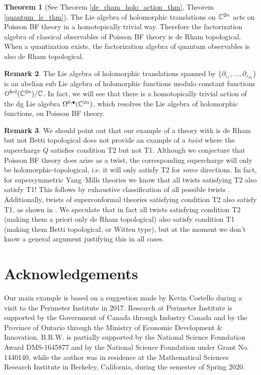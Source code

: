 \documentclass[11pt, oneside, reqno]{amsart}
\theoremstyle{definition} \newtheorem{definition}{Definition}[section]
\newtheorem{theorem}[definition]{Theorem}
\theoremstyle{definition}
\theoremstyle{remark}
\theoremstyle{definition} \newtheorem{remark}[definition]{Remark}
\theoremstyle{definition} \newtheorem{remarks}[definition]{Remarks}
\theoremstyle{definition} \newtheorem{question}[definition]{Question}
\theoremstyle{definition} \newtheorem*{note}{Note}
\theoremstyle{definition} \newtheorem{example}[definition]{Example}
\theoremstyle{definition} \newtheorem{examples}[definition]{Examples}
\def\bu{\bullet}
\begin{document}
\begin{theorem}[{See Theorem \ref{de_rham_holo_action_thm}, Theorem \ref{quantum_lc_thm}}]
The Lie algebra of holomorphic translations on $\mathbb C^{2n}$ acts on Poisson BF theory in a homotopically trivial way. 
Therefore the factorization algebra of classical observables of Poisson BF theory is de Rham topological.  When a quantization exists, the factorization algebra of quantum observables is also de Rham topological.
\end{theorem}

\begin{remark}
The Lie algebra of holomorphic translations spanned by $\{\partial_{z_1}, \ldots, \partial_{z_{2n}}\}$ is an abelian sub Lie algebra of holomorphic functions modulo constant functions $\mathcal O^{\rm hol}(\mathbb C^{2n}) / \mathbb C$. 
In fact, we will see that there is a homotopically trivial action of the dg Lie algebra $\Omega^{0,\bu}(\CC^{2n})$, which resolves the Lie algebra of holomorphic functions, on Poisson BF theory.
\end{remark}

\begin{remark}
We should point out that our example of a theory with is de Rham but not Betti topological does not provide an example of a \emph{twist} where the supercharge $Q$ satisfies condition T2 but not T1.  Although we conjecture that Poisson BF theory does arise as a twist, the corresponding supercharge will only be holomorphic-topological, i.e. it will only satisfy T2 for \emph{some} directions.  In fact, for supersymmetric Yang--Mills theories we know that all twists satisfying T2 also satisfy T1!  This follows by exhaustive classification of all possible twists \cite{ESW}.  Additionally, twists of superconformal theories satisfying condition T2 also satisfy T1, as shown in \cite{ElliottSafronov}.  We speculate that in fact all twists satisfying condition T2 (making them a priori only de Rham topological) also satisfy condition T1 (making them Betti topological, or Witten type), but at the moment we don't know a general argument justifying this in all cases. 
\end{remark}

\section*{Acknowledgements}
Our main example is based on a suggestion made by Kevin Costello during a visit to the Perimeter Institute in 2017.  
Research at Perimeter Institute is supported by the Government of Canada through Industry Canada and by the Province of Ontario through the Ministry of Economic Development \& Innovation.
B.R.W. is partially supported by the National Science Foundation Award DMS-1645877 and by the National Science Foundation under Grant No. 1440140, while the author was in residence at the Mathematical Sciences Research Institute in Berkeley, California, during the semester of Spring 2020.
\end{document}
